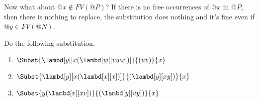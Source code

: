 \documentclass[../../../include/open-logic-section]{subfiles}
\begin{document}
Now what about $@x \notin FV(@P)$? If there is no free occurrences
of $@x$ in $@P$, then there is nothing to replace, the substitution does
nothing and it's fine even if $@y \in FV(@N)$.

\begin{prob}
  Do the following substitution.
  \begin{enumerate}
    \item $\Subst{\lambd[y][x(\lambd[w][vwx])]}{(uv)}{x}$
    \item $\Subst{\lambd[y][x(\lambd[x][x])]}{(\lambd[y][xy])}{x}$
    \item $\Subst{y(\lambd[v][xv])}{(\lambd[y][vy])}{x}$
  \end{enumerate}
\end{prob}
\end{document}
